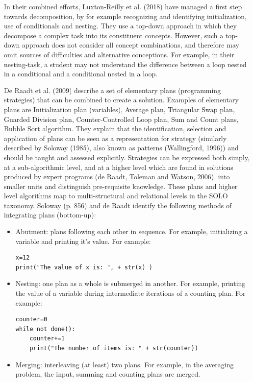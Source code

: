 In their combined efforts, Luxton-Reilly et al. (2018) have managed a first step towards decomposition, by for example recognizing and identifying initialization, use of conditionals and nesting. They use a top-down approach in which they decompose a complex task into its constituent concepts. However, such a top-down approach does not consider all concept combinations, and therefore may omit sources of difficulties and alternative conceptions. For example, in their nesting-task, a student may not understand the difference between a loop nested in a conditional and a conditional nested in a loop.



De Raadt et al. (2009) describe a set of elementary plans (programming strategies) that can be combined to create a solution. Examples of elementary plans are Initialization plan (variables), Average plan, Triangular Swap plan, Guarded Division plan, Counter-Controlled Loop plan, Sum and Count plans, Bubble Sort algorithm. They explain that the identification, selection and application of plans can be seen as a representation for strategy (similarly described by Soloway (1985), also known as patterns (Wallingford, 1996)) and should be taught and assessed explicitly.
Strategies can be expressed both simply, at a sub-algorithmic level, and at a higher level which are found in solutions produced by expert programs (de Raadt, Toleman and Watson, 2006).  into  smaller units and distinguish pre-requisite knowledge. These plans and higher level algorithms map to multi-structural and relational levels in the SOLO taxonomy. Soloway (p. 856) and de Raadt identify the following methods of integrating plans (bottom-up):
\begin{itemize}
\item Abutment: plans following each other in sequence. For example, initializing a variable and printing it’s value. For example:
\begin{verbatim}
x=12
print("The value of x is: ", + str(x) )
\end{verbatim}

\item Nesting: one plan as a whole is submerged in another. For example, printing the value of a variable during intermediate iterations of a counting plan. For example:
\begin{verbatim}
counter=0
while not done():
    counter+=1
    print("The number of items is: " + str(counter))
\end{verbatim}

\item Merging: interleaving (at least) two plans. For example, in the averaging problem, the input, summing and counting plans are merged.
\end{itemize}

